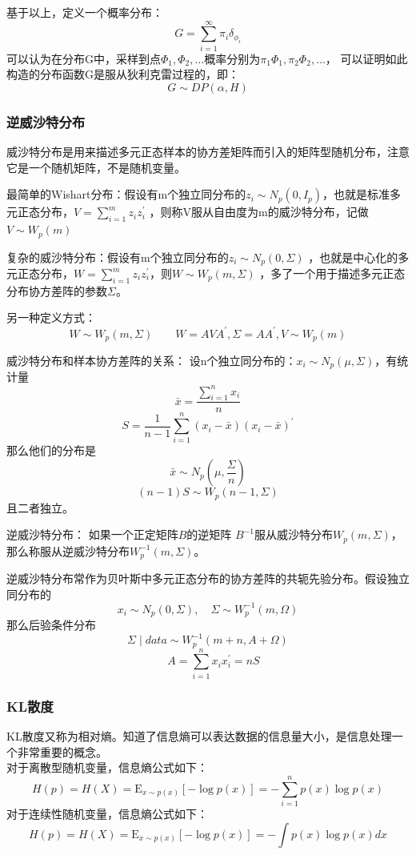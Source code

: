 \documentclass[a4paper,twoside]{article}
\theoremstyle{definition} \newtheorem{law}[thm]{Law}
\theoremstyle{plain} \newtheorem{jury}[thm]{Jury}
\theoremstyle{remark} \newtheorem*{marg}{Margaret}
\begin{document}
基于以上，定义一个概率分布：
$$
G=\sum_{i=1}^{\infty} \pi_{i} \delta_{\phi_{i}}
$$
可以认为在分布G中，采样到点$\Phi_1,\Phi_2,\dots$概率分别为$\pi_1\Phi_1,\pi_2\Phi_2,\dots$，
可以证明如此构造的分布函数G是服从狄利克雷过程的，即：
$$G\sim DP(\alpha,H)$$
\subsubsection*{逆威沙特分布}
威沙特分布是用来描述多元正态样本的协方差矩阵而引入的矩阵型随机分布，注意它是一个随机矩阵，不是随机变量。

最简单的Wishart分布：假设有m个独立同分布的$z_{i} \sim N_{p}\left(0, I_{p}\right)$，也就是标准多元正态分布，$V=\sum_{i=1}^{m} z_{i} z_{i}^{\prime}$  ，则称V服从自由度为m的威沙特分布，记做$V\sim W_p(m)$

复杂的威沙特分布：假设有m个独立同分布的$z_{i} \sim N_{p}(0, \Sigma)$   ，也就是中心化的多元正态分布，$W=\sum_{i=1}^{m} z_{i} z_{i}^{\prime}$，则$W\sim W_p(m,\Sigma)$ ，多了一个用于描述多元正态分布协方差阵的参数$\Sigma$。

另一种定义方式：
$$
W \sim W_{p}(m, \Sigma) \quad \quad W=A V A^{\prime}, \Sigma=A A^{\prime}, V \sim W_{p}(m)
$$

威沙特分布和样本协方差阵的关系： 设n个独立同分布的：$x_i\sim N_p(\mu,\Sigma)$，有统计量$$\bar{x}=\frac{\sum_{i=1}^{n} x_{i}}{n}$$ $$S=\frac{1}{n-1} \sum_{i=1}^{n}\left(x_{i}-\bar{x}\right)\left(x_{i}-\bar{x}\right)^{\prime}$$ 那么他们的分布是$$\bar{x} \sim N_{p}\left(\mu, \frac{\Sigma}{n}\right)$$ $$(n-1) S \sim W_{p}(n-1, \Sigma)$$且二者独立。 

逆威沙特分布： 如果一个正定矩阵$B$的逆矩阵  $B^{-1}$服从威沙特分布$W_p(m,\Sigma)$，那么称服从逆威沙特分布$W_p^{-1}(m,\Sigma)$。

逆威沙特分布常作为贝叶斯中多元正态分布的协方差阵的共轭先验分布。假设独立同分布的
$$x_{i} \sim N_{p}(0, \Sigma), \quad \Sigma \sim W_{p}^{-1}(m, \Omega)$$
那么后验条件分布
$$\Sigma \mid data \sim W_{p}^{-1}(m+n, A+\Omega)$$ $$\quad A=\sum_{i=1}^{n} x_{i} x_{i}^{\prime}=n S$$
\subsubsection*{KL散度}
KL散度又称为相对熵。知道了信息熵可以表达数据的信息量大小，是信息处理一个非常重要的概念。\\
对于离散型随机变量，信息熵公式如下：
$$
H(p)=H(X)=\mathrm{E}_{x \sim p(x)}[-\log p(x)]=-\sum_{i=1}^{n} p(x) \log p(x)
$$
对于连续性随机变量，信息熵公式如下：
$$
H(p)=H(X)=\mathrm{E}_{x \sim p(x)}[-\log p(x)]=-\int p(x) \log p(x) d x
$$
\end{document}
